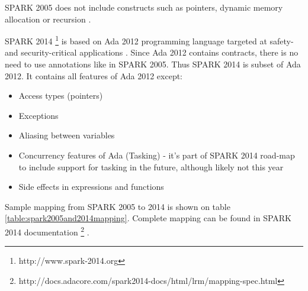 SPARK 2005 does not include constructs such as pointers, dynamic memory allocation or recursion \cite{Spark:Article}.

SPARK 2014 \footnote{http://www.spark-2014.org} is based on Ada 2012 programming language targeted at safety- and security-critical applications \cite{Spark2014:Paper}. Since Ada 2012 contains contracts, there is no need to use annotations like in SPARK 2005. Thus SPARK 2014 is subset of Ada 2012. It contains all features of Ada 2012 except:
\begin{itemize} \itemsep1pt \parskip0pt 
 	\item Access types (pointers)
 	\item Exceptions
	\item Aliasing between variables
	\item Concurrency features of Ada (Tasking) - it's part of SPARK 2014 road-map to include support for tasking in the future, although likely not this year
	\item Side effects in expressions and functions
\end{itemize}

Sample mapping from SPARK 2005 to 2014 is shown on table \ref{table:spark2005and2014mapping}. Complete mapping can be found in SPARK 2014 documentation \footnote{http://docs.adacore.com/spark2014-docs/html/lrm/mapping-spec.html} \cite{Spark2014refManual:Online}.

